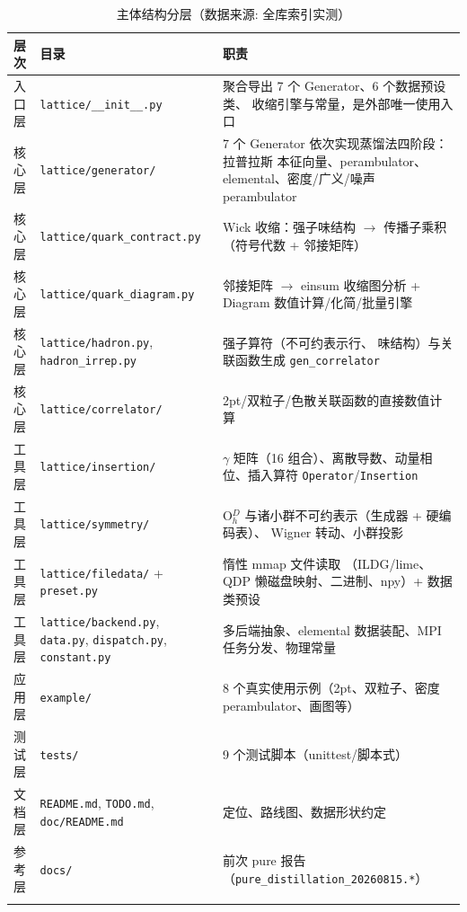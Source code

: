 \documentclass[UTF8]{ctexart}
\begin{document}
\begin{xltabular}{\textwidth}{lXX}
\toprule
\textcolor{struct}{层次} & \textcolor{struct}{目录} & \textcolor{struct}{职责} \\
\midrule
\endhead
入口层 & \texttt{\nolinkurl{lattice/__init__.py}} & 聚合导出 7 个 Generator、6 个数据预设类、
收缩引擎与常量，是外部唯一使用入口 \\
核心层 & \texttt{\nolinkurl{lattice/generator/}} & 7 个 Generator 依次实现蒸馏法四阶段：拉普拉斯
本征向量、perambulator、elemental、密度/广义/噪声 perambulator \\
核心层 & \texttt{\nolinkurl{lattice/quark_contract.py}} & Wick 收缩：强子味结构 $\to$ 传播子乘积
（符号代数 + 邻接矩阵） \\
核心层 & \texttt{\nolinkurl{lattice/quark_diagram.py}} & 邻接矩阵 $\to$ einsum 收缩图分析 +
Diagram 数值计算/化简/批量引擎 \\
核心层 & \texttt{\nolinkurl{lattice/hadron.py}}, \texttt{\nolinkurl{hadron_irrep.py}} & 强子算符（不可约表示行、
味结构）与关联函数生成 \texttt{gen\_correlator} \\
核心层 & \texttt{\nolinkurl{lattice/correlator/}} & 2pt/双粒子/色散关联函数的直接数值计算 \\
工具层 & \texttt{\nolinkurl{lattice/insertion/}} & $\gamma$ 矩阵（16 组合）、离散导数、动量相位、插入算符
\texttt{Operator}/\texttt{Insertion} \\
工具层 & \texttt{\nolinkurl{lattice/symmetry/}} & O$_h^D$ 与诸小群不可约表示（生成器 + 硬编码表）、
Wigner 转动、小群投影 \\
工具层 & \texttt{\nolinkurl{lattice/filedata/}} + \texttt{\nolinkurl{preset.py}} & 惰性 mmap 文件读取
（ILDG/lime、QDP 懒磁盘映射、二进制、npy）+ 数据类预设 \\
工具层 & \texttt{\nolinkurl{lattice/backend.py}}, \texttt{\nolinkurl{data.py}}, \texttt{\nolinkurl{dispatch.py}}, \texttt{\nolinkurl{constant.py}} & 多后端抽象、elemental 数据装配、MPI 任务分发、物理常量 \\
应用层 & \texttt{\nolinkurl{example/}} & 8 个真实使用示例（2pt、双粒子、密度 perambulator、画图等） \\
测试层 & \texttt{\nolinkurl{tests/}} & 9 个测试脚本（unittest/脚本式） \\
文档层 & \texttt{\nolinkurl{README.md}}, \texttt{\nolinkurl{TODO.md}}, \texttt{\nolinkurl{doc/README.md}} & 定位、路线图、数据形状约定 \\
参考层 & \texttt{\nolinkurl{docs/}} & 前次 pure 报告（\texttt{\nolinkurl{pure_distillation_20260815.*}}） \\
\bottomrule
\caption{主体结构分层（数据来源: 全库索引实测）}
\end{xltabular}
\end{document}
